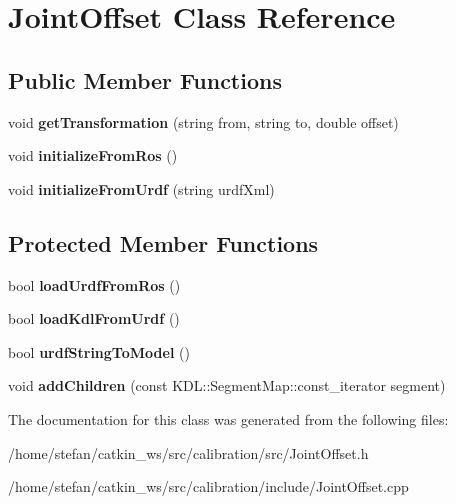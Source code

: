\hypertarget{classJointOffset}{\section{\-Joint\-Offset \-Class \-Reference}
\label{classJointOffset}
}
\subsection*{\-Public \-Member \-Functions}
\begin{DoxyCompactItemize}
\item 
\hypertarget{classJointOffset_a1f9d93ce12e8c3598a3925da7ed0bc65}{void {\bfseries get\-Transformation} (string from, string to, double offset)}\label{classJointOffset_a1f9d93ce12e8c3598a3925da7ed0bc65}

\item 
\hypertarget{classJointOffset_af0a5608b9766a8ff4c26d4625358d727}{void {\bfseries initialize\-From\-Ros} ()}\label{classJointOffset_af0a5608b9766a8ff4c26d4625358d727}

\item 
\hypertarget{classJointOffset_a967bb552c3d01de5f296dff47291ea69}{void {\bfseries initialize\-From\-Urdf} (string urdf\-Xml)}\label{classJointOffset_a967bb552c3d01de5f296dff47291ea69}

\end{DoxyCompactItemize}
\subsection*{\-Protected \-Member \-Functions}
\begin{DoxyCompactItemize}
\item 
\hypertarget{classJointOffset_a24ece39d95a5fac5be88fc2691d82a16}{bool {\bfseries load\-Urdf\-From\-Ros} ()}\label{classJointOffset_a24ece39d95a5fac5be88fc2691d82a16}

\item 
\hypertarget{classJointOffset_a985a24ef7973b8378b5e4c226ac7cd64}{bool {\bfseries load\-Kdl\-From\-Urdf} ()}\label{classJointOffset_a985a24ef7973b8378b5e4c226ac7cd64}

\item 
\hypertarget{classJointOffset_a3e7e5bc603ba006e0250af9098186a91}{bool {\bfseries urdf\-String\-To\-Model} ()}\label{classJointOffset_a3e7e5bc603ba006e0250af9098186a91}

\item 
\hypertarget{classJointOffset_aceb352a0fb3c8335ff69f742d76bba82}{void {\bfseries add\-Children} (const \-K\-D\-L\-::\-Segment\-Map\-::const\-\_\-iterator segment)}\label{classJointOffset_aceb352a0fb3c8335ff69f742d76bba82}

\end{DoxyCompactItemize}


\-The documentation for this class was generated from the following files\-:\begin{DoxyCompactItemize}
\item 
/home/stefan/catkin\-\_\-ws/src/calibration/src/\-Joint\-Offset.\-h\item 
/home/stefan/catkin\-\_\-ws/src/calibration/include/\-Joint\-Offset.\-cpp\end{DoxyCompactItemize}
